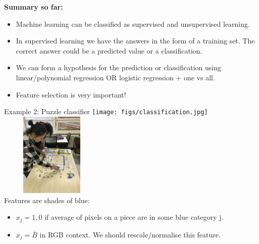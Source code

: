 \documentclass[usenames,dvipsnames]{beamer}
\begin{document}
\begin{frame}
{\huge  \bf Summary so far: } 
\begin{itemize}
\item
Machine learning can be classified as supervised and unsupervised learning. \pause
\item 
In supervised learning we have the answers in the form of a training set. The correct answer could be a predicted value or a classification. \pause
\item
We can form a hypothesis for the prediction or classification using linear/polynomial regression OR logistic regression + one vs all. \pause
\item
Feature selection is very important!
\end{itemize}
\end{frame}

\begin{frame}{Example 2: Puzzle classifier } 
\centering
    \texttt{[image: figs/classification.jpg]} \pause
        \includegraphics[width=5cm,height=4cm]{figs/ml_coffee.jpg} \\  \pause
   Features are shades of blue: 
 \begin{itemize}
 \item
  $x_j = 1,0$ if average of pixels on a piece are in some blue category j.  
  \item
  $x_j = \bar{B}$ in RGB context. We should rescale/normalise this feature.  
\end{itemize}

\end{frame}
\end{document}

